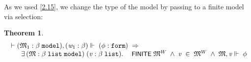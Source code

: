 \documentclass{llncs}
\newtheorem{thm}{Theorem}[chapter]
\newenvironment{holmath}{\begin{displaymath}\begin{array}{l}}{\end{array}\end{displaymath}\ignorespacesafterend}
\renewcommand{\HOLConst}[1]{{\textsf{\upshape\small #1}}}
\begin{document}
As we used \ref{2.15}, we change the type of the model by passing to a finite model via selection:
\begin{thm}
{\upshape\cite[Theorem 2.34 (Finite model property, via selection)]{Blackburn}}
\begin{holmath}
  \ensuremath{\HOLTokenTurnstile}(\HOLFreeVar{\ensuremath{\mathfrak{M}}}\sb{\mathrm{1}} :\ensuremath{\beta}\;\HOLTyOp{model}),(\HOLFreeVar{w}\sb{\mathrm{1}} :\ensuremath{\beta})\ensuremath{\Vdash}\;(\HOLFreeVar{\ensuremath{\phi}} :\HOLTyOp{form})\;\HOLSymConst{\HOLTokenImp{}}\\
\;\;\;\;\;\;\;\HOLSymConst{\HOLTokenExists{}}(\HOLBoundVar{\ensuremath{\mathfrak{M}}} :\ensuremath{\beta}\;\HOLTyOp{list}\;\HOLTyOp{model})\;(\HOLBoundVar{v} :\ensuremath{\beta}\;\HOLTyOp{list}).\;\HOLConst{FINITE}\;\HOLBoundVar{\ensuremath{\mathfrak{M}}}\HOLSymConst{\ensuremath{\sp{W}}}\;\HOLSymConst{\HOLTokenConj{}}\;\HOLBoundVar{v}\;\HOLSymConst{\HOLTokenIn{}}\;\HOLBoundVar{\ensuremath{\mathfrak{M}}}\HOLSymConst{\ensuremath{\sp{W}}}\;\HOLSymConst{\HOLTokenConj{}}\;\HOLBoundVar{\ensuremath{\mathfrak{M}}},\HOLBoundVar{v}\ensuremath{\Vdash}\;\HOLFreeVar{\ensuremath{\phi}}
\end{holmath}
\end{thm}
\end{document}
